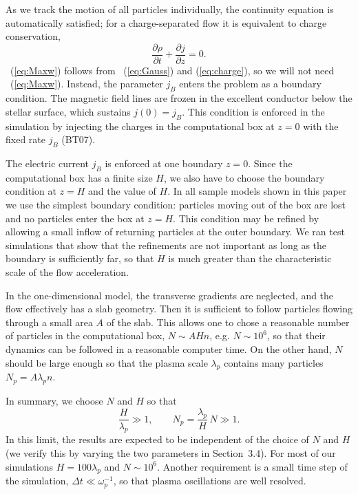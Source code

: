 As we track the motion of all particles individually, the continuity equation is
automatically satisfied; for a charge-separated flow it is equivalent to charge
conservation,
\begin{equation}
\label{eq:charge}
    \frac{\partial\rho}{\partial t}+\frac{\partial j}{\partial z}=0.
\end{equation}
\Eq~(\ref{eq:Maxw}) follows from \Eqs~(\ref{eq:Gauss}) and (\ref{eq:charge}),
so we will not need \Eq~(\ref{eq:Maxw}).
Instead, the parameter $j_B$ enters the problem as a boundary condition.
The magnetic field lines are frozen in the excellent conductor below the stellar
surface, which sustains $j(0)=j_B$.
This condition is enforced in the simulation by injecting the charges in
the computational box at $z=0$ with the fixed rate $j_B$ (BT07).

The electric current $j_B$ is enforced at one boundary $z=0$. Since
the computational box has a finite size $H$, we also have to choose the
boundary condition at $z=H$ and the value of $H$. In all sample models
shown in this paper we use the simplest boundary condition:
particles moving out of the box are lost and no particles enter the box at
$z=H$. This condition may be refined by allowing a small inflow of returning
particles at the outer boundary. We ran test simulations that show that the
refinements are not important as long as the boundary is sufficiently far,
so that $H$ is much greater than the characteristic scale of the flow acceleration.

In the one-dimensional model, the transverse
gradients are neglected, and the flow effectively has a slab geometry.
Then it is sufficient to follow particles flowing through a small area $A$ of the slab.
This allows one to chose a reasonable number of particles in the computational
box, $N\sim AHn$, e.g. $N\sim 10^6$, so that their dynamics can be followed
in a reasonable computer time. On the other hand,
$N$ should be large enough so that the plasma scale $\lambda_p$ contains
many particles $N_p=A\lambda_p n$.

In summary, we choose $N$ and $H$ so that
\begin{equation}
    \frac{H}{\lambda_p}\gg 1, \qquad N_p=\frac{\lambda_p}{H}\,N \gg 1.
\end{equation}
In this limit, the results are expected to be independent of the choice of $N$ and
$H$ (we verify this by varying the two parameters in Section~3.4). For most of our
simulations $H=100\lambda_p$ and $N\sim 10^6$. Another requirement is a small
time step of the simulation, $\Delta t\ll\omega_p^{-1}$, so that plasma oscillations
are well resolved.


